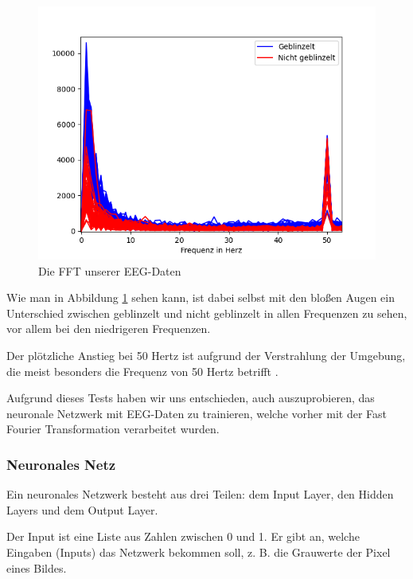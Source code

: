 \documentclass{scrartcl}
\begin{document}
	\begin{figure}[h!]
		\includegraphics[width=\textwidth]{pictures/Die_FFTs_der_EEG-Daten.png}
		\caption{Die FFT unserer EEG-Daten}
		\label{EEG-FFT}
	\end{figure}

	Wie man in Abbildung \ref{EEG-FFT} sehen kann, ist dabei selbst mit den bloßen Augen ein Unterschied zwischen geblinzelt und nicht geblinzelt in allen Frequenzen zu sehen, vor allem bei den niedrigeren Frequenzen.%

	Der plötzliche Anstieg bei 50 Hertz ist aufgrund der Verstrahlung der Umgebung, die meist besonders die Frequenz von 50 Hertz betrifft \cite{Praktikum}.

	Aufgrund dieses Tests haben wir uns entschieden, auch auszuprobieren, das neuronale Netzwerk mit EEG-Daten zu trainieren, welche vorher mit der Fast Fourier Transformation verarbeitet wurden.

	\newpage
	\subsubsection{Neuronales Netz}

	Ein neuronales Netzwerk besteht aus drei Teilen: dem Input Layer, den Hidden Layers und dem Output Layer.

	Der Input ist eine Liste aus Zahlen zwischen 0 und 1. Er gibt an, welche Eingaben (Inputs) das Netzwerk bekommen soll, z. B. die Grauwerte der Pixel eines Bildes.
	
\end{document}
